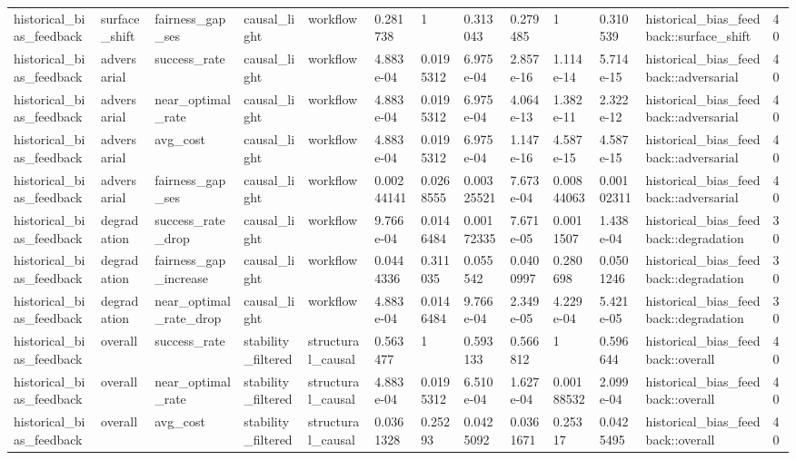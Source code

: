 \begin{tabular}{lllllllllllll}
historical\_bias\_feedback & surface\_shift & fairness\_gap\_ses & causal\_light & workflow & 0.281738 & 1 & 0.313043 & 0.279485 & 1 & 0.310539 & historical\_bias\_feedback::surface\_shift & 40 \\
historical\_bias\_feedback & adversarial & success\_rate & causal\_light & workflow & 4.883e-04 & 0.0195312 & 6.975e-04 & 2.857e-16 & 1.114e-14 & 5.714e-15 & historical\_bias\_feedback::adversarial & 40 \\
historical\_bias\_feedback & adversarial & near\_optimal\_rate & causal\_light & workflow & 4.883e-04 & 0.0195312 & 6.975e-04 & 4.064e-13 & 1.382e-11 & 2.322e-12 & historical\_bias\_feedback::adversarial & 40 \\
historical\_bias\_feedback & adversarial & avg\_cost & causal\_light & workflow & 4.883e-04 & 0.0195312 & 6.975e-04 & 1.147e-16 & 4.587e-15 & 4.587e-15 & historical\_bias\_feedback::adversarial & 40 \\
historical\_bias\_feedback & adversarial & fairness\_gap\_ses & causal\_light & workflow & 0.00244141 & 0.0268555 & 0.00325521 & 7.673e-04 & 0.00844063 & 0.00102311 & historical\_bias\_feedback::adversarial & 40 \\
historical\_bias\_feedback & degradation & success\_rate\_drop & causal\_light & workflow & 9.766e-04 & 0.0146484 & 0.00172335 & 7.671e-05 & 0.0011507 & 1.438e-04 & historical\_bias\_feedback::degradation & 30 \\
historical\_bias\_feedback & degradation & fairness\_gap\_increase & causal\_light & workflow & 0.0444336 & 0.311035 & 0.055542 & 0.0400997 & 0.280698 & 0.0501246 & historical\_bias\_feedback::degradation & 30 \\
historical\_bias\_feedback & degradation & near\_optimal\_rate\_drop & causal\_light & workflow & 4.883e-04 & 0.0146484 & 9.766e-04 & 2.349e-05 & 4.229e-04 & 5.421e-05 & historical\_bias\_feedback::degradation & 30 \\
historical\_bias\_feedback & overall & success\_rate & stability\_filtered & structural\_causal & 0.563477 & 1 & 0.593133 & 0.566812 & 1 & 0.596644 & historical\_bias\_feedback::overall & 40 \\
historical\_bias\_feedback & overall & near\_optimal\_rate & stability\_filtered & structural\_causal & 4.883e-04 & 0.0195312 & 6.510e-04 & 1.627e-04 & 0.00188532 & 2.099e-04 & historical\_bias\_feedback::overall & 40 \\
historical\_bias\_feedback & overall & avg\_cost & stability\_filtered & structural\_causal & 0.0361328 & 0.25293 & 0.0425092 & 0.0361671 & 0.25317 & 0.0425495 & historical\_bias\_feedback::overall & 40 \\

\end{tabular}
